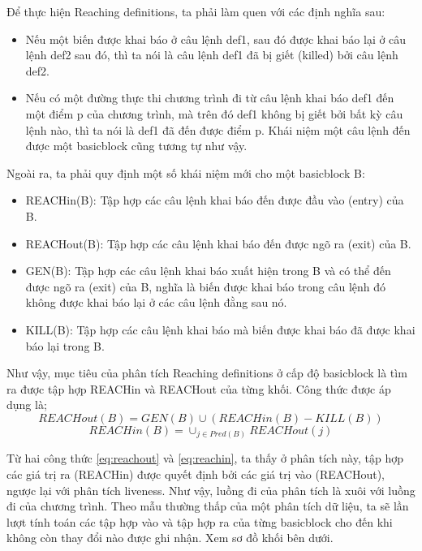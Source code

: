 Để thực hiện Reaching definitions, ta phải làm quen với các định nghĩa sau:
\begin{itemize}
	\item Nếu một biến được khai báo ở câu lệnh def1, sau đó được khai báo lại ở câu lệnh def2 sau đó, thì ta nói là câu lệnh def1 đã bị giết (killed) bởi câu lệnh def2.
	\item Nếu có một đường thực thi chương trình đi từ câu lệnh khai báo def1 đến một điểm p của chương trình, mà trên đó def1 không bị giết bởi bất kỳ câu lệnh nào, thì ta nói là def1 đã đến được điểm p. Khái niệm một câu lệnh đến được một basicblock cũng tương tự như vậy.
\end{itemize}

Ngoài ra, ta phải quy định một số khái niệm mới cho một basicblock B:
\begin{itemize}
	\item REACHin(B): Tập hợp các câu lệnh khai báo đến được đầu vào (entry) của B.
	\item REACHout(B): Tập hợp các câu lệnh khai báo đến được ngõ ra (exit) của B.
	\item GEN(B): Tập hợp các câu lệnh khai báo xuất hiện trong B và có thể đến được ngõ ra (exit) của B, nghĩa là biến được khai báo trong câu lệnh đó không được khai báo lại ở các câu lệnh đằng sau nó.
	\item KILL(B): Tập hợp các câu lệnh khai báo mà biến được khai báo đã được khai báo lại trong B.
\end{itemize}

Như vậy, mục tiêu của phân tích Reaching definitions ở cấp độ basicblock là tìm ra được tập hợp REACHin và REACHout của từng khối. Công thức được áp dụng là;
\begin{equation} \label{eq:reachout}
	REACHout(B) = GEN(B) \cup (REACHin(B)-KILL(B))
\end{equation}	
\begin{equation} \label{eq:reachin}
REACHin(B) = \cup_{j \in Pred(B)} REACHout(j)
\end{equation}	

Từ hai công thức \ref{eq:reachout} và \ref{eq:reachin}, ta thấy ở phân tích này, tập hợp các giá trị ra (REACHin) được quyết định bởi các giá trị vào (REACHout), ngược lại với phân tích liveness. Như vậy, luồng đi của phân tích là xuôi với luồng đi của chương trình. Theo mẫu thường thấp của một phân tích dữ liệu, ta sẽ lần lượt tính toán các tập hợp vào và tập hợp ra của từng basicblock cho đến khi không còn thay đổi nào được ghi nhận. Xem sơ đồ khối bên dưới.


